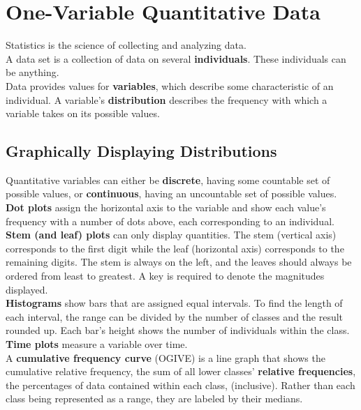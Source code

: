 \documentclass[../AP_Statistics.tex]{subfiles}
\begin{document}
	\chapter{One-Variable Quantitative Data}
		Statistics is the science of collecting and analyzing data. \\
		A data set is a collection of data on several \textbf{individuals}. These individuals can be anything. \\
		Data provides values for \textbf{variables}, which describe some characteristic of an individual.
		A variable's \textbf{distribution} describes the frequency with which a variable takes on its possible values.
		\section{Graphically Displaying Distributions}
			Quantitative variables can either be \textbf{discrete}, having some countable set of possible values, or \textbf{continuous}, having an uncountable set of possible values. \\
			\textbf{Dot plots} assign the horizontal axis to the variable and show each value's frequency with a number of dots above, each corresponding to an individual. \\
			\textbf{Stem (and leaf) plots} can only display quantities. The stem (vertical axis) corresponds to the first digit while the leaf (horizontal axis) corresponds to the remaining digits. The stem is always on the left, and the leaves should always be ordered from least to greatest. A key is required to denote the magnitudes displayed. \\
			\textbf{Histograms} show bars that are assigned equal intervals. To find the length of each interval, the range can be divided by the number of classes and the result rounded up. Each bar's height shows the number of individuals within the class. \\
			\textbf{Time plots} measure a variable over time. \\
			A \textbf{cumulative frequency curve} (OGIVE) is a line graph that shows the cumulative relative frequency, the sum of all lower classes' \textbf{relative frequencies}, the percentages of data contained within each class, (inclusive). Rather than each class being represented as a range, they are labeled by their medians.
\end{document}
